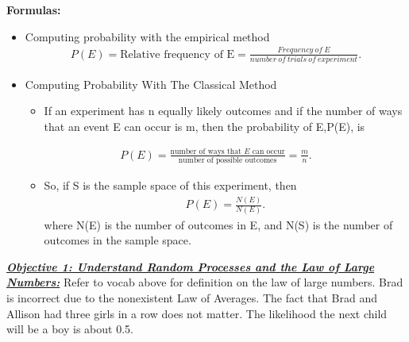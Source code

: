 \documentclass{report}
\begin{document}
    \pagebreak \bigbreak \noindent
    \textbf{Formulas:}
    \begin{itemize}
        \item Computing probability with the empirical method
        \begin{align*}
            P(E) = \text{Relative frequency of E} = \frac{Frequency\ of\ E}{number\ of\ trials\ of\ experiment}
        .\end{align*}
        \item Computing Probability With The Classical Method
            \begin{itemize}
                \item If an experiment has n equally likely outcomes and if the number of ways that an event E can occur is m, then the probability of E,P(E), is
            \end{itemize}
            \begin{align*}
                P(E) = \frac{\text{number of ways that $E$ can occur}}{\text{number of possible outcomes}} = \frac{m}{n}
            .\end{align*}
            \begin{itemize}
                \item So, if S is the sample space of this experiment, then
                    \begin{align*}
                        P(E) = \frac{N(E)}{N(E)}
                    .\end{align*}
            where N(E) is the number of outcomes in E, and N(S) is the number of outcomes in the sample space.
            \end{itemize}
    \end{itemize}


    \pagebreak \bigbreak \noindent
    \textbf{\textit{\underline{Objective 1: Understand Random Processes and the Law of Large Numbers:}}}
    \bigbreak \noindent 
    Refer to vocab above for definition on the law of large numbers.
    \bigbreak \noindent 
    \bigbreak \noindent 
    Brad is incorrect due to the nonexistent Law of Averages. The fact that Brad and Allison had three girls in a row does not matter. The likelihood the next child will be a boy is about 0.5.
\end{document}
